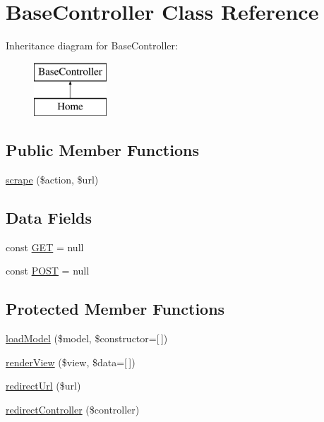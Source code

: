 \hypertarget{class_base_controller}{}\section{Base\+Controller Class Reference}
\label{class_base_controller}
Inheritance diagram for Base\+Controller\+:\begin{figure}[H]
\begin{center}
\leavevmode
\includegraphics[height=2.000000cm]{class_base_controller}
\end{center}
\end{figure}
\subsection*{Public Member Functions}
\begin{DoxyCompactItemize}
\item 
\hyperlink{class_base_controller_ae4f5f67da98c9ef6b1df8d3eb61158df}{scrape} (\$action, \$url)
\end{DoxyCompactItemize}
\subsection*{Data Fields}
\begin{DoxyCompactItemize}
\item 
const \hyperlink{class_base_controller_a036e3adfeab59b468951a7ebb383f953}{G\+ET} = null
\item 
const \hyperlink{class_base_controller_a266e25cc4bc4d1fc753aede118504cf9}{P\+O\+ST} = null
\end{DoxyCompactItemize}
\subsection*{Protected Member Functions}
\begin{DoxyCompactItemize}
\item 
\hyperlink{class_base_controller_a5fa8890bd3a9d20f5c0cc2377dc49eb1}{load\+Model} (\$model, \$constructor=\mbox{[}$\,$\mbox{]})
\item 
\hyperlink{class_base_controller_aa0c49b95cd8e5ff8ff61b4a2c35bf1eb}{render\+View} (\$view, \$data=\mbox{[}$\,$\mbox{]})
\item 
\hyperlink{class_base_controller_a9f95c7503770ed9c974005b363ec3d00}{redirect\+Url} (\$url)
\item 
\hyperlink{class_base_controller_a85ddb683efc64655be063b697f631beb}{redirect\+Controller} (\$controller)
\end{DoxyCompactItemize}


